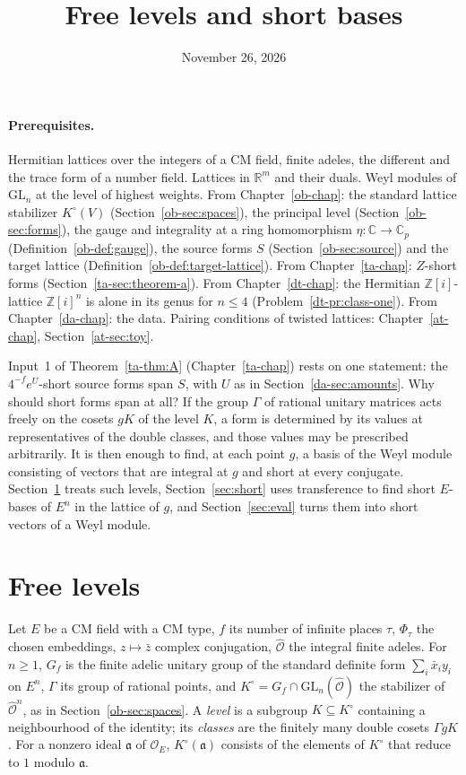 \documentclass[reqno]{amsart}
\title{Free levels and short bases}
\author{}
\date{November 26, 2026}
\newcounter{chap}
\theoremstyle{definition}
\theoremstyle{plain}
\theoremstyle{remark}
\newcommand{\Z}{\mathbb{Z}}
\newcommand{\R}{\mathbb{R}}
\newcommand{\C}{\mathbb{C}}
\newcommand{\Oc}{\mathcal{O}}
\newcommand{\Oh}{\hat{\mathcal{O}}}
\newcommand{\Ko}{K^\circ}
\begin{document}
\maketitle
{}\label{chap}

\paragraph{Prerequisites.}
Hermitian lattices over the integers of a CM field, finite adeles, the different and the trace form of a number field.  Lattices in \(\R^m\) and their duals.  Weyl modules of \(\mathrm{GL}_n\) at the level of highest weights.  From Chapter~\ref{ob-chap}: the standard lattice stabilizer \(\Ko(V)\) (Section~\ref{ob-sec:spaces}), the principal level (Section~\ref{ob-sec:forms}), the gauge and integrality at a ring homomorphism \(\eta\colon\C\to\C_p\) (Definition~\ref{ob-def:gauge}), the source forms \(S\) (Section~\ref{ob-sec:source}) and the target lattice (Definition~\ref{ob-def:target-lattice}).  From Chapter~\ref{ta-chap}: \(Z\)-short forms (Section~\ref{ta-sec:theorem-a}).  From Chapter~\ref{dt-chap}: the Hermitian \(\Z[i]\)-lattice \(\Z[i]^n\) is alone in its genus for \(n\le4\) (Problem~\ref{dt-pr:class-one}).  From Chapter~\ref{da-chap}: the data.  Pairing conditions of twisted lattices: Chapter~\ref{at-chap}, Section~\ref{at-sec:toy}.

\medskip
Input~1 of Theorem~\ref{ta-thm:A} (Chapter~\ref{ta-chap}) rests on one statement: the \(4^{-f}e^U\)-short source forms span \(S\), with \(U\) as in Section~\ref{da-sec:amounts}.  Why should short forms span at all?  If the group \(\Gamma\) of rational unitary matrices acts freely on the cosets \(gK\) of the level \(K\), a form is determined by its values at representatives of the double classes, and those values may be prescribed arbitrarily.  It is then enough to find, at each point \(g\), a basis of the Weyl module consisting of vectors that are integral at \(g\) and short at every conjugate.  Section~\ref{sec:free} treats such levels, Section~\ref{sec:short} uses transference to find short \(E\)-bases of \(E^n\) in the lattice of \(g\), and Section~\ref{sec:eval} turns them into short vectors of a Weyl module.

\section{Free levels}\label{sec:free}

Let \(E\) be a CM field with a CM type, \(f\) its number of infinite places \(\tau\), \(\Phi_\tau\) the chosen embeddings, \(z\mapsto\bar z\) complex conjugation, \(\Oh\) the integral finite adeles.  For \(n\ge1\), \(G_f\) is the finite adelic unitary group of the standard definite form \(\sum_i\bar x_iy_i\) on \(E^n\), \(\Gamma\) its group of rational points, and \(\Ko = G_f\cap\mathrm{GL}_n(\Oh)\) the stabilizer of \(\Oh^n\), as in Section~\ref{ob-sec:spaces}.  A \emph{level} is a subgroup \(K\subseteq\Ko\) containing a neighbourhood of the identity; its \emph{classes} are the finitely many double cosets \(\Gamma gK\).  For a nonzero ideal \(\mathfrak a\) of \(\Oc_E\), \(\Ko(\mathfrak a)\) consists of the elements of \(\Ko\) that reduce to \(1\) modulo \(\mathfrak a\).
\end{document}
